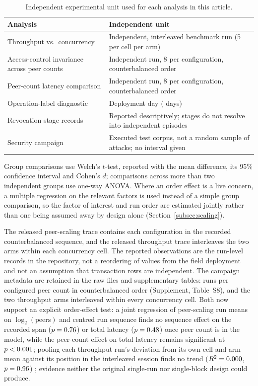\documentclass[a4paper,fleqn]{cas-sc}
\begin{document}
\begin{table}[pos=t]
\caption{Independent experimental unit used for each analysis in this article.}
\label{tab:units}
\small
\begin{tabularx}{\columnwidth}{@{}lX@{}}
\toprule
Analysis & Independent unit \\
\midrule
Throughput vs.\ concurrency &
  Independent, interleaved benchmark run (5 per cell per arm) \\
Access-control invariance across peer counts &
  Independent run, 8 per configuration, counterbalanced order \\
Peer-count latency comparison &
  Independent run, 8 per configuration, counterbalanced order \\
Operation-label diagnostic &
  Deployment day (\DeployDays{} days) \\
Revocation stage records &
  Reported descriptively; stages do not resolve into independent episodes \\
Security campaign &
  Executed test corpus, not a random sample of attacks; no interval given \\
\bottomrule
\end{tabularx}
\end{table}

Group comparisons use Welch's $t$-test, reported with the mean difference,
its 95\% confidence interval and Cohen's $d$; comparisons across more than
two independent groups use one-way ANOVA. Where an order effect is a live
concern, a multiple regression on the relevant factors is used instead of a
simple group comparison, so the factor of interest and run order are
estimated jointly rather than one being assumed away by design alone
(Section~\ref{subsec:scaling}).

The released peer-scaling trace contains each configuration in the recorded
counterbalanced sequence, and the released throughput trace interleaves the
two arms within each concurrency cell. The reported observations are the
run-level records in the repository, not a reordering of values from the
field deployment and not an assumption that transaction rows are
independent. The campaign metadata are retained in the raw files and
supplementary tables: \PartRunsPerConfig{} runs per configured peer count in
counterbalanced order (Supplement, Table~S8), and the two throughput arms
interleaved within every concurrency cell. Both now support an explicit
order-effect
test: a joint regression of peer-scaling run means on $\log_2(\text{peers})$
and centred run sequence finds no sequence effect on the recorded span
($p=0.76$) or total latency ($p=0.48$) once
peer count is in the model, while the peer-count effect on total latency
remains significant at $p<0.001$; pooling each throughput
run's deviation from its own cell-and-arm mean against its position in the
interleaved session finds no trend ($R^2=0.000$, $p=0.96$)
; evidence
neither the original single-run nor single-block design could produce.
\end{document}
